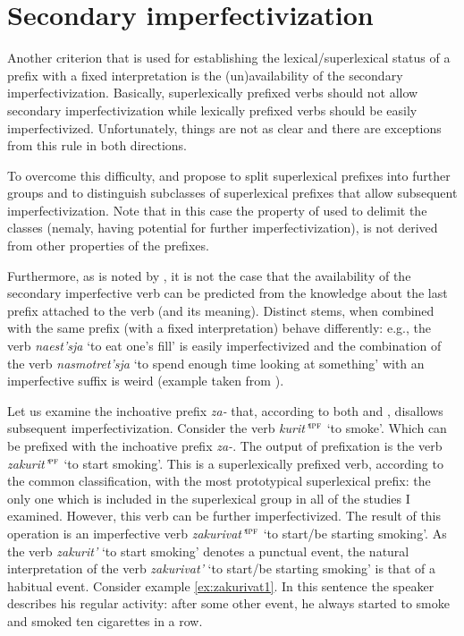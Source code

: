 \section{Secondary imperfectivization}\label{section:new:imperfectivization}
Another criterion that is used for establishing the lexical/superlexical status of a prefix with a fixed interpretation is the (un)availability of the secondary imperfectivization. Basically, superlexically prefixed verbs should not allow secondary imperfectivization while lexically prefixed verbs should be easily imperfectivized. Unfortunately, things are not as clear and there are exceptions from this rule in both directions. 

To overcome this difficulty, \citet{Svenonius:04b} and \citet{Tatevosov:07, Tatevosov:09} propose to split superlexical prefixes into further groups and to distinguish subclasses of superlexical prefixes that allow subsequent imperfectivization. Note that in this case the property of used to delimit the classes (nemaly, having potential for further imperfectivization), is not derived from other properties of the prefixes.

Furthermore, as is noted by \citet[35]{Kagan:book}, it is not the case that the availability of the secondary imperfective verb can be predicted from the knowledge about the last prefix attached to the verb (and its meaning). Distinct stems, when combined with the same prefix (with a fixed interpretation) behave differently: e.g., the verb \textit{naest’sja} `to eat one's fill' is easily imperfectivized and the combination of the verb \textit{nasmotret'sja} `to spend enough time looking at something' with an imperfective suffix is weird (example taken from \citealt[35]{Kagan:book}).

Let us examine the inchoative prefix \textit{za-} that, according to both \citet[230]{Svenonius:04b} and \citet[116]{Tatevosov:09}, disallows subsequent imperfectivization. Consider the verb \textit{kurit'}$^{\textsc{ipf}}$ `to smoke'. Which can be prefixed with the inchoative prefix {\textit{za-}.} The output of prefixation is the verb \textit{zakurit'}$^{\textsc{pf}}$ `to start smoking'. This is a superlexically prefixed verb, according to the common classification, with the most prototypical superlexical prefix: the only one which is included in the superlexical group in all of the studies I examined. However, this verb can be further imperfectivized. The result of this operation is an imperfective verb \textit{zakurivat'}$^{\textsc{ipf}}$ `to start/be starting smoking'. As the verb \textit{zakurit'} `to start smoking' denotes a punctual event, the natural interpretation of the verb \textit{zakurivat'} `to start/be starting smoking'  is that of a habitual event. Consider example \ref{ex:zakurivat1}. In this sentence the speaker describes his regular activity: after some other event, he always started to smoke and smoked ten cigarettes in a row. 


